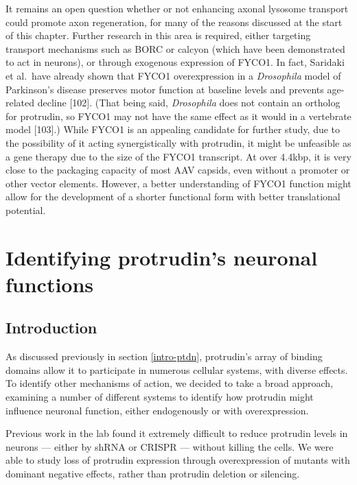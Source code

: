 \documentclass[
  12pt,
  a4paper,
]{book}
\renewcommand{\chaptermark}[1]{\markboth{#1}{}}
\begin{document}
It remains an open question whether or not enhancing axonal lysosome transport could promote axon regeneration, for many of the reasons discussed at the start of this chapter. Further research in this area is required, either targeting transport mechanisms such as BORC or calcyon (which have been demonstrated to act in neurons), or through exogenous expression of FYCO1. In fact, Saridaki et al.~have already shown that FYCO1 overexpression in a \emph{Drosophila} model of Parkinson's disease preserves motor function at baseline levels and prevents age-related decline {[}102{]}. (That being said, \emph{Drosophila} does not contain an ortholog for protrudin, so FYCO1 may not have the same effect as it would in a vertebrate model {[}103{]}.) While FYCO1 is an appealing candidate for further study, due to the possibility of it acting synergistically with protrudin, it might be unfeasible as a gene therapy due to the size of the FYCO1 transcript. At over 4.4kbp, it is very close to the packaging capacity of most AAV capsids, even without a promoter or other vector elements. However, a better understanding of FYCO1 function might allow for the development of a shorter functional form with better translational potential.

\hypertarget{identifying-protrudins-neuronal-functions}{%
\chapter{Identifying protrudin's neuronal functions}\label{identifying-protrudins-neuronal-functions}}

\chaptermark{Neuronal functions}

\hypertarget{introduction-1}{%
\section{Introduction}\label{introduction-1}}

As discussed previously in section \ref{intro-ptdn}, protrudin's array of binding domains allow it to participate in numerous cellular systems, with diverse effects. To identify other mechanisms of action, we decided to take a broad approach, examining a number of different systems to identify how protrudin might influence neuronal function, either endogenously or with overexpression.

Previous work in the lab found it extremely difficult to reduce protrudin levels in neurons --- either by shRNA or CRISPR --- without killing the cells. We were able to study loss of protrudin expression through overexpression of mutants with dominant negative effects, rather than protrudin deletion or silencing.
\end{document}
